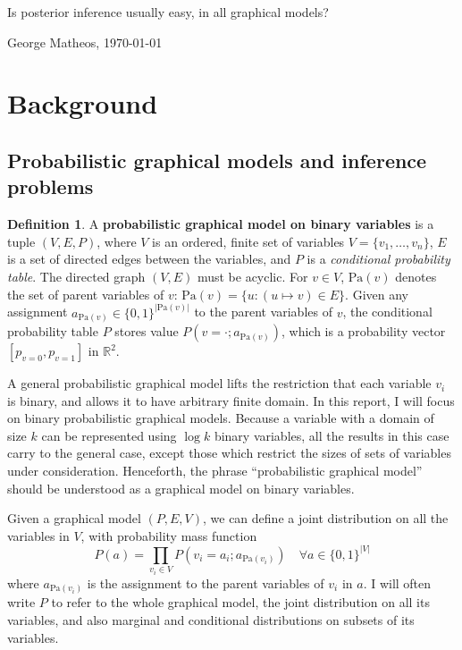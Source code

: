 \documentclass{article}
\theoremstyle{definition}
\newtheorem{defn}{Definition}
\theoremstyle{remark}
\def \Pa{\text{Pa}}
\begin{document}
\begin{center}
    \Large
    Is posterior inference usually easy, in all graphical models?

    \vspace{3pt}
    \normalsize
    George Matheos, \today
\end{center}


\section{Background}

\subsection{Probabilistic graphical models and inference problems}
\begin{defn}
A \textbf{probabilistic graphical model on binary variables} is a tuple $(V, E, P)$, where $V$ is an ordered, finite set of variables $V = \{v_1, \dots, v_n\}$, $E$ is a set of directed edges between the variables, and $P$ is a \textit{conditional probability table}.
The directed graph $(V, E)$ must be acyclic.
For $v \in V$, $\Pa(v)$ denotes the set of parent variables of $v$: $\Pa(v) = \{u : (u \mapsto v) \in E\}$.
Given any assignment $a_{\Pa(v)} \in \{0, 1\}^{|\Pa(v)|}$ to the parent variables of $v$, the conditional probability table $P$ stores value $P(v = \cdot ; a_{\Pa(v)})$, which is a probability vector $[p_{v=0}, p_{v=1}]$ in $\mathbb{R}^2$.
\end{defn}

A general probabilistic graphical model lifts the restriction that each variable $v_i$ is binary, and allows it to have arbitrary finite domain.
In this report, I will focus on binary probabilistic graphical models. Because a variable with a domain of size $k$ can be represented using $\log k$ binary variables, all the results in this case carry to the general case, except those which restrict the sizes of sets of variables under consideration.
Henceforth, the phrase ``probabilistic graphical model'' should be understood as a graphical model on binary variables.

Given a graphical model $(P, E, V)$, we can define a joint distribution on all the variables in $V$, with probability mass function
$$
P(a) = \prod_{v_i \in V}{P(v_i = a_i ; a_{\Pa(v_i)})} \quad \forall a \in \{0, 1\}^{|V|}
$$
where $a_{\Pa(v_i)}$ is the assignment to the parent variables of $v_i$ in $a$.
I will often write $P$ to refer to the whole graphical model, the joint distribution on all its variables, and also marginal and conditional distributions on subsets of its variables.
\end{document}
